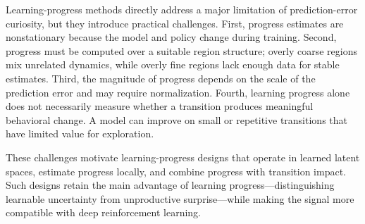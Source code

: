 Learning-progress methods directly address a major limitation of prediction-error curiosity, but they introduce practical challenges.
First, progress estimates are nonstationary because the model and policy change during training.
Second, progress must be computed over a suitable region structure; overly coarse regions mix unrelated dynamics, while overly fine regions lack enough data for stable estimates.
Third, the magnitude of progress depends on the scale of the prediction error and may require normalization.
Fourth, learning progress alone does not necessarily measure whether a transition produces meaningful behavioral change.
A model can improve on small or repetitive transitions that have limited value for exploration.

These challenges motivate learning-progress designs that operate in learned latent spaces, estimate progress locally, and combine progress with transition impact.
Such designs retain the main advantage of learning progress---distinguishing learnable uncertainty from unproductive surprise---while making the signal more compatible with deep reinforcement learning.
